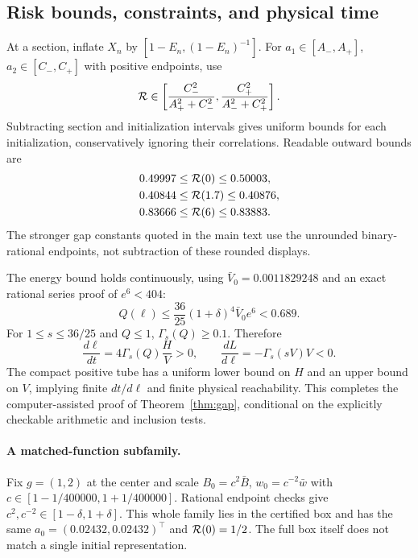 \subsection{Risk bounds, constraints, and physical time}
At a section, inflate $X_n$ by $[1-E_n,(1-E_n)^{-1}]$. For $a_1\in[A_-,A_+]$, $a_2\in[C_-,C_+]$ with positive endpoints, use
\begin{equation}
\mathcal R\in\left[\frac{C_-^2}{A_+^2+C_-^2},
\frac{C_+^2}{A_-^2+C_+^2}\right].
\end{equation}
Subtracting section and initialization intervals gives uniform bounds for each initialization, conservatively ignoring their correlations. Readable outward bounds are
\begin{align}
0.49997&\leq\mathcal R(0)\leq0.50003,\\
0.40844&\leq\mathcal R(1.7)\leq0.40876,\\
0.83666&\leq\mathcal R(6)\leq0.83883.
\end{align}
The stronger gap constants quoted in the main text use the unrounded binary-rational endpoints, not subtraction of these rounded displays.

The energy bound holds continuously, using $\bar V_0=0.0011829248$ and an exact rational series proof of $e^6<404$:
\begin{equation}
Q(\ell)\leq\frac{36}{25}(1+\delta)^4\bar V_0e^6<0.689.
\end{equation}
For $1\leq s\leq36/25$ and $Q\leq1$, $\Gamma_s(Q)\geq0.1$. Therefore
\begin{equation}
\frac{d\ell}{dt}=4\Gamma_s(Q)\frac HV>0,
\qquad\frac{dL}{d\ell}=-\Gamma_s(sV)V<0.
\end{equation}
The compact positive tube has a uniform lower bound on $H$ and an upper bound on $V$, implying finite $dt/d\ell$ and finite physical reachability. This completes the computer-assisted proof of Theorem~\ref{thm:gap}, conditional on the explicitly checkable arithmetic and inclusion tests.

\paragraph{A matched-function subfamily.}
Fix $g=(1,2)$ at the center and scale $B_0=c^2\bar B$, $w_0=c^{-2}\bar w$ with $c\in[1-1/400000,1+1/400000]$. Rational endpoint checks give $c^2,c^{-2}\in[1-\delta,1+\delta]$. This whole family lies in the certified box and has the same $a_0=(0.02432,0.02432)^\top$ and $\mathcal R(0)=1/2$. The full box itself does not match a single initial representation.

